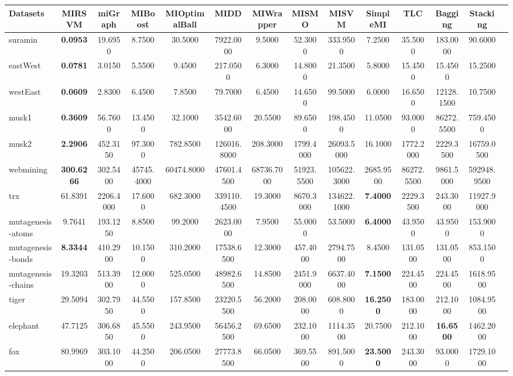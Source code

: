 \begin{threeparttable}
\begin{tabular}{lccccccccccccc}
\toprule
Datasets &MIRSVM &miGraph &MIBoost &MIOptimalBall &MIDD &MIWrapper &MISMO &MISVM &SimpleMI &TLC &Bagging &Stacking \\
\midrule
suramin &\textbf{0.0953} &19.6950 &8.7500 &30.5000 &7922.0000 &9.5000 &52.3000 &333.9500 &7.2500 &35.5000 &183.0000 &90.6000 &  \\
eastWest &\textbf{0.0781} &3.0150 &5.5500 &9.4500 &217.0500 &6.3000 &14.8000 &21.3500 &5.8000 &15.4500 &15.4500 &15.2500 &  \\
westEast &\textbf{0.0609} &2.8300 &6.4500 &7.8500 &79.7000 &6.4500 &14.6500 &99.5000 &6.0000 &16.6500 &12128.1500 &10.7500 &  \\
musk1 &\textbf{0.3609} &56.7600 &13.4500 &32.1000 &3542.6000 &20.5500 &89.6500 &198.4500 &11.0500 &93.0000 &86272.5500 &759.4500 &  \\
musk2 &\textbf{2.2906} &452.3150 &97.3000 &782.8500 &126016.8000 &208.3000 &1799.4000 &26093.5000 &16.1000 &1772.2000 &2229.3500 &16759.0500 &  \\
webmining &\textbf{300.6266} &302.5400 &45745.4000 &60474.8000 &47601.4500 &68736.7000 &51923.5500 &105622.3000 &2685.9500 &86272.5500 &9861.5000 &592948.9500 &  \\
trx &61.8391 &2206.4000 &17.6000 &682.3000 &339110.4500 &19.3000 &8670.3000 &134622.1000 &\textbf{7.4000} &2229.3500 &243.3000 &11927.9000 &  \\
mutagenesis-atoms &9.7641 &193.1250 &8.8500 &99.2000 &2623.0000 &7.9500 &55.0000 &53.5000 &\textbf{6.4000} &43.9500 &43.9500 &153.9000 &  \\
mutagenesis-bonds &\textbf{8.3344} &410.2900 &10.1500 &310.2000 &17538.6500 &12.3000 &457.4000 &2794.7500 &8.4500 &131.0500 &131.0500 &853.1500 &  \\
mutagenesis-chains &19.3203 &513.3900 &12.0000 &525.0500 &48982.6500 &14.8500 &2451.9000 &6637.4000 &\textbf{7.1500} &224.4500 &224.4500 &1618.9500 &  \\
tiger &29.5094 &302.7950 &44.5500 &157.8500 &23220.5500 &56.2000 &208.0000 &608.8000 &\textbf{16.2500} &183.0000 &212.1000 &1084.9500 &  \\
elephant &47.7125 &306.6850 &45.5500 &243.9500 &56456.2500 &69.6500 &232.1000 &1114.3500 &20.7500 &212.1000 &\textbf{16.6500} &1462.2000 &  \\
fox &80.9969 &303.1000 &44.2500 &206.0500 &27773.8500 &66.0500 &369.5500 &891.5000 &\textbf{23.5000} &243.3000 &93.0000 &1729.1000 &  \\

\end{tabular}
\end{threeparttable}
